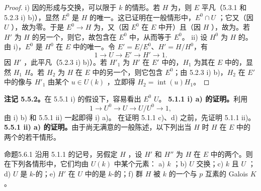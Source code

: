 \begin{proof}
i) 因的形成与交换，可以限于 $k$ 的情形。若 $H$ 为，则 $E$ 平凡（5.3.1 和 5.2.3 i) b)），显然 $E^0$ 是 $H$ 的唯一。这已证明在一般情形中，$E^0\cap U$ ；它又（因 $U$ ），故为零。于是 $E^0\to H$ 为，又（因 $E^0$ 在 $E$ 中开）且（因 $H$ ），故为。若 $H'$ 为 $H$ 的另一个，则它，故包含在 $E^0$ 中，从而等于 $E^0$。
ii) 设 $H^0$ 为 $H$ 的。由 i)，$E^0$ 是 $H^0$ 在 $E$ 中的唯一。令 $E'=E/E^0$、$H'=H/H^0$，有
\[1\longrightarrow U\longrightarrow E'\longrightarrow H'\longrightarrow1.\]
因 $H'$ ，此平凡（5.2.3 i) b)）。若 $H'_1$ 为 $H'$ 在 $E'$ 中的，$H_1$ 为其在 $E$ 中的，显然 $H_1$  $H$。若 $H_2$ 为 $H$ 在 $E$ 中的另一个，则它包含 $E^0$；由 5.2.3 i) b)，$H_2$ 在 $E'$ 中的像与 $H'_1$ 由某个 $u\in U(k)$ ，立即得 $H_2=\operatorname{int}(u)H_1$。
\end{proof}
\textbf{注记 5.5.2。}在 5.5.1 i) 的假设下，容易看出 $E^0$  $U$。
\textbf{5.1.1 i) a) 的证明。}利用
\[1\longrightarrow U^0\longrightarrow U\longrightarrow U/U^0\longrightarrow1,\]
由 i) b) 和 5.5.1 ii) 一起即得 i) a)。
在证明 5.1.1 c)、d) 之前，先证明 5.1.1 ii)。
\textbf{5.5.1 ii) a) 的证明。}由于尚无满意的一般陈述，以下列出当 $H$ 时 $H$ 在 $E$ 中的两个的若干情形。
\begin{SGAresult}{命题}{5.6.1}
沿用 5.1.1 的记号，另假定 $H$ ，设 $H'$ 和 $H''$ 为 $H$ 在 $E$ 中的两个。则在下列各情形中，它们均由 $U(k)$ 中某个元素：
a) $k$ ；b) $U$ 交换；c) $k$ 且 $U$ ；
d) $U$ 是 $k$-的；e) $H'$ 在 $U$ 中的是 $k$-的；f) 群 $H$ 被 $k$ 的一个与 $p$ 互素的 Galois  $K$ 。
\end{SGAresult}
